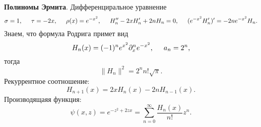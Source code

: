 \textbf{Полиномы Эрмита}. Дифференциральное уравнение
\begin{equation*}
    \sigma = 1, \hspace{5 mm} 
    \tau = - 2 x,
    \hspace{5 mm} \rho(x)  = e^{-x^2},
    \hspace{5 mm} 
    H_n'' - 2 x H_n' + 2 n H_n = 0, 
    \hspace{5 mm} 
    (e^{-x^2} H_n')' = -2 n e^{-x^2} H_n.
\end{equation*}
Знаем, что формула Родрига примет вид
\begin{equation*}
    H_n (x) = (-1)^n e^{x^2} \partial_x^n e^{-x^2},
    \hspace{5 mm} 
    a_n = 2^n,
\end{equation*}
тогда
\begin{equation*}
    \|H_n\|^2 =  2^n n! \sqrt{\pi}.
\end{equation*}
Рекуррентное соотношение:
\begin{equation*}
    H_{n+1} (x) = 2 x H_n (x) - 2 n H_{n-1} (x).
\end{equation*}
Производящаяя функция:
\begin{equation*}
    \psi(x,z) = e^{-z^2+2 zx} = \sum_{n=0}^{\infty}  \frac{H_n (x)}{n!} z^n.
\end{equation*}
